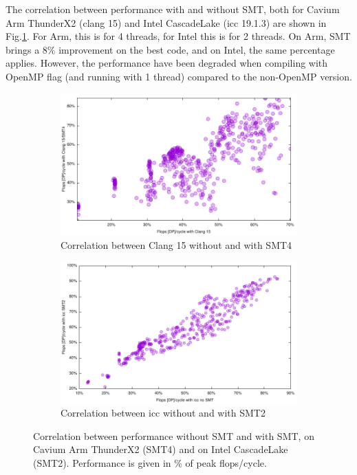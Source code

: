 \documentclass{article}
\begin{document}
The correlation between performance with and without SMT, both for Cavium Arm ThunderX2 (clang 15) and Intel CascadeLake (icc 19.1.3) are shown in Fig.\ref{fig:SMT}. For Arm, this is for 4 threads, for Intel this is for 2 threads. On Arm, SMT brings a $8\%$ improvement on the best code, and on Intel, the same percentage applies. However, the performance have been degraded when compiling with OpenMP flag (and running with 1 thread) compared to the non-OpenMP version.
\begin{figure}[h!]
  \begin{subfigure}[h]{0.45\textwidth}  
\includegraphics[width=\textwidth]{../benches/gemm/arm-64x256x64/clangxsmt.pdf}
  \caption{Correlation between Clang 15 without and with SMT4}
  \end{subfigure}
    \begin{subfigure}[h]{0.45\textwidth}  
\includegraphics[width=\textwidth]{../benches/gemm/cascadelake-64x256x64/icc1thx2th.pdf}
  \caption{Correlation between icc without and with SMT2}
    \end{subfigure}
    \caption{Correlation between performance without SMT and with SMT, on Cavium Arm ThunderX2 (SMT4) and on Intel CascadeLake (SMT2). Performance is given in \% of peak flops/cycle. \label{fig:SMT}}
\end{figure}
\end{document}
